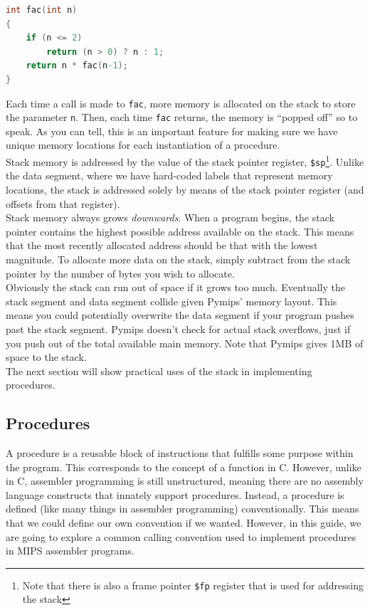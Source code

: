 \documentclass[12pt]{article}
\begin{document}
\begin{lstlisting}[language=C]
int fac(int n)
{
    if (n <= 2)
        return (n > 0) ? n : 1;
    return n * fac(n-1);
}
\end{lstlisting}

Each time a call is made to \texttt{fac}, more memory is allocated on the stack
     to store the parameter \texttt{n}. Then, each time \texttt{fac} returns,
     the memory is ``popped off'' so to speak. As you can tell, this is an
     important feature for making sure we have unique memory locations for each
     instantiation of a procedure.\\

Stack memory is addressed by the value of the stack pointer register,
     \texttt{\$sp}\footnote{Note that there is also a frame pointer
     \texttt{\$fp} register that is used for addressing the stack}. Unlike the
     data segment, where we have hard-coded labels that represent memory
     locations, the stack is addressed solely by means of the stack pointer
     register (and offsets from that register).\\

Stack memory always grows \textit{downwards}. When a program begins, the stack
     pointer contains the highest possible address available on the stack. This
     means that the most recently allocated address should be that with the
     lowest magnitude. To allocate more data on the stack, simply subtract from
     the stack pointer by the number of bytes you wish to allocate.\\

Obviously the stack can run out of space if it grows too much. Eventually the
     stack segment and data segment collide given Pymips' memory layout. This
     means you could potentially overwrite the data segment if your program
     pushes past the stack segment. Pymips doesn't check for actual stack
     overflows, just if you push out of the total available main memory. Note
     that Pymips gives 1MB of space to the stack.\\

The next section will show practical uses of the stack in implementing
     procedures.

\subsection{Procedures}
\label{sec:proc}

A procedure is a reusable block of instructions that fulfills some purpose
     within the program. This corresponds to the concept of a function in
     C. However, unlike in C, assembler programming is still unstructured,
     meaning there are no assembly language constructs that innately support
     procedures. Instead, a procedure is defined (like many things in assembler
     programming) conventionally. This means that we could define our own
     convention if we wanted. However, in this guide, we are going to explore a
     common calling convention used to implement procedures in MIPS assembler
     programs.\\
\end{document}
